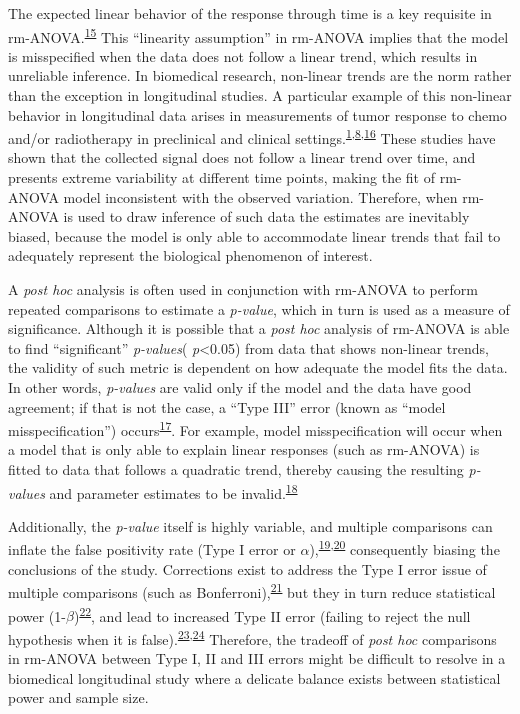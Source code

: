\documentclass[
]{article}
\begin{document}
The expected linear behavior of the response through time is a key requisite in rm-ANOVA.\textsuperscript{\protect\hyperlink{ref-pinheiro2006}{15}} This ``linearity assumption'' in rm-ANOVA implies that the model is misspecified when the data does not follow a linear trend, which results in unreliable inference. In biomedical research, non-linear trends are the norm rather than the exception in longitudinal studies. A particular example of this non-linear behavior in longitudinal data arises in measurements of tumor response to chemo and/or radiotherapy in preclinical and clinical settings.\textsuperscript{\protect\hyperlink{ref-roblyer2011}{1},\protect\hyperlink{ref-skala2010}{8},\protect\hyperlink{ref-vishwanath2009}{16}} These studies have shown that the collected signal does not follow a linear trend over time, and presents extreme variability at different time points, making the fit of rm-ANOVA model inconsistent with the observed variation. Therefore, when rm-ANOVA is used to draw inference of such data the estimates are inevitably biased, because the model is only able to accommodate linear trends that fail to adequately represent the biological phenomenon of interest.

A \emph{post hoc} analysis is often used in conjunction with rm-ANOVA to perform repeated comparisons to estimate a \emph{p-value}, which in turn is used as a measure of significance.
Although it is possible that a \emph{post hoc} analysis of rm-ANOVA is able to find ``significant'' \emph{p-values}( \emph{p}\textless0.05) from data that shows non-linear trends, the validity of such metric is dependent on how adequate the model fits the data. In other words, \emph{p-values} are valid only if the model and the data have good agreement; if that is not the case, a ``Type III'' error (known as ``model misspecification'') occurs\textsuperscript{\protect\hyperlink{ref-dennis2019}{17}}. For example, model misspecification will occur when a model that is only able to explain linear responses (such as rm-ANOVA) is fitted to data that follows a quadratic trend, thereby causing the resulting \emph{p-values} and parameter estimates to be invalid.\textsuperscript{\protect\hyperlink{ref-wang2019}{18}}

Additionally, the \emph{p-value} itself is highly variable, and multiple comparisons can inflate the false positivity rate (Type I error or \(\alpha\)),\textsuperscript{\protect\hyperlink{ref-liu2010}{19},\protect\hyperlink{ref-halsey2015}{20}} consequently biasing the conclusions of the study. Corrections exist to address the Type I error issue of multiple comparisons (such as Bonferroni),\textsuperscript{\protect\hyperlink{ref-abdi2010}{21}} but they in turn reduce statistical power (1-\(\beta\))\textsuperscript{\protect\hyperlink{ref-nakagawa2004}{22}}, and lead to increased Type II error (failing to reject the null hypothesis when it is false).\textsuperscript{\protect\hyperlink{ref-gelman2012}{23},\protect\hyperlink{ref-albers2019}{24}} Therefore, the tradeoff of \emph{post hoc} comparisons in rm-ANOVA between Type I, II and III errors might be difficult to resolve in a biomedical longitudinal study where a delicate balance exists between statistical power and sample size.
\end{document}
